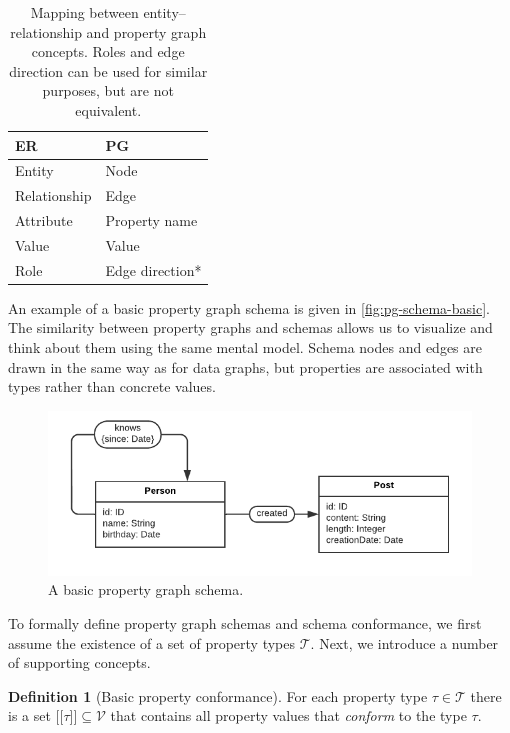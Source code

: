\documentclass{article}
\theoremstyle{definition}
\newtheorem{definition}{Definition}
\newcommand{\ptype}{\tau}
\newcommand{\ptypes}{\mathcal{T}}
\newcommand{\lsem}{\ensuremath{[\![}}
\newcommand{\rsem}{\ensuremath{]\!]}}
\newcommand{\sem}[1]{\ensuremath{\lsem #1 \rsem}}
\begin{document}
\begin{table}[t]
  \centering
  \begin{tabular}{|l|l|}
    \hline
    \textbf{ER}  & \textbf{PG}     \\
    \hline
    Entity       & Node            \\
    Relationship & Edge            \\
    Attribute    & Property name   \\
    Value        & Value           \\
    Role         & Edge direction* \\
    \hline
  \end{tabular}
  \caption{Mapping between entity--relationship and property graph concepts. Roles and edge direction can be used for similar purposes, but are not equivalent.}
  \label{tab:er-pg}
\end{table}

An example of a basic property graph schema is given in \autoref{fig:pg-schema-basic}. The similarity between property graphs and schemas allows us to visualize and think about them using the same mental model. Schema nodes and edges are drawn in the same way as for data graphs, but properties are associated with types rather than concrete values.

\begin{figure}[t]
  \centering
  \includegraphics{figures/pg-schema-basic.pdf}
  \caption{A basic property graph schema.}
  \label{fig:pg-schema-basic}
\end{figure}

To formally define property graph schemas and schema conformance, we first assume the existence of a set of property types $\mathcal{T}$. Next, we introduce a number of supporting concepts.

\begin{definition}[Basic property conformance]
  \label{def:property-conformance-basic}
  For each property type $\ptype \in \ptypes$ there is a set $\sem{\ptype} \subseteq \mathcal{V}$ that contains all property values that \emph{conform} to the type $\ptype$.
\end{definition}
\end{document}
